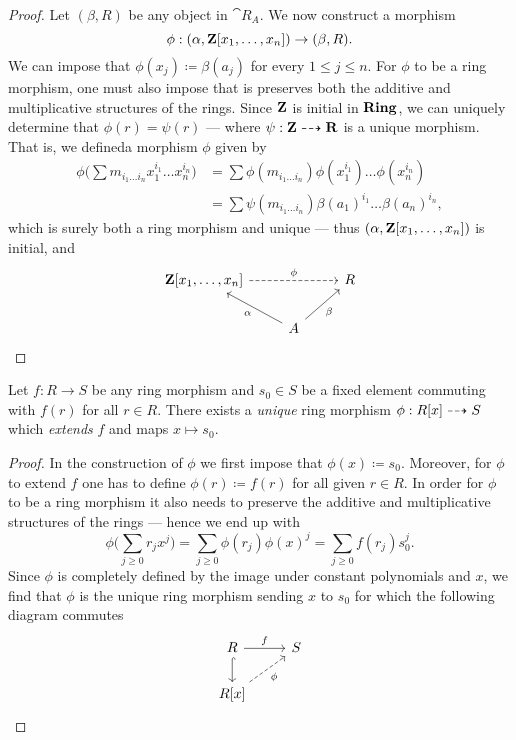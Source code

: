 %
\begin{proof}
Let \((\beta, R)\) be any object in \(\cat R_A\). We now construct a morphism
\[
\phi: (\alpha, \mathbf{Z}[x_1, \dots, x_n]) \to (\beta, R).
\]
We can impose that \(\phi(x_j) \coloneq \beta(a_j)\) for every
\(1 \leq j \leq n\). For \(\phi\) to be a ring morphism, one must also impose
that is preserves both the additive and multiplicative structures of the
rings. Since \(\mathbf{Z}\) is initial in \({\textbf{Ring}}\), we can uniquely determine that
\(\phi(r) = \psi(r)\) --- where \(\psi: \mathbf{Z} \dashrightarrow \mathbf{R}\) is a unique
morphism. That is, we defineda morphism \(\phi\) given by
\begin{align*}
  \phi\bigg( \sum m_{i_1 \dots i_n} x_1^{i_1} \dots x_n^{i_n} \bigg)
  &= \sum \phi(m_{i_1 \dots i_n}) \phi(x_1^{i_1}) \dots \phi(x_n^{i_n}) \\
  &= \sum \psi(m_{i_1 \dots i_n}) \beta(a_1)^{i_1} \dots \beta(a_n)^{i_n},
\end{align*}
which is surely both a ring morphism and unique --- thus \((\alpha, \mathbf{Z}[x_1,
\dots, x_n])\) is initial, and
\[
\begin{tikzcd}
\Z[x_1, \dots, x_n] \ar[rr, dashed, "\phi"] & &R \\
&A \ar[lu, "\alpha"] \ar[ru, swap, "\beta"]   &
\end{tikzcd}
\]
\end{proof}
%

%
\begin{proposition}
\label{prop:universal-property-polynomial-rings}
Let \(f: R \to S\) be any ring morphism and \(s_0 \in S\) be a fixed element
commuting with \(f(r)\) for all \(r \in R\). There exists a \emph{unique} ring
morphism \(\phi: R[x] \dashrightarrow S\) which \emph{extends} \(f\) and maps
\(x \mapsto s_0\).
\end{proposition}
%

%
\begin{proof}
In the construction of \(\phi\) we first impose that \(\phi(x) \coloneq
s_0\). Moreover, for \(\phi\) to extend \(f\) one has to define \(\phi(r)
\coloneq f(r)\) for all given \(r \in R\). In order for \(\phi\) to be a ring
morphism it also needs to preserve the additive and multiplicative structures of
the rings --- hence we end up with
\[
\phi\bigg( \sum_{j \geq 0} r_j x^j \bigg)
= \sum_{j \geq 0} \phi(r_j) \phi(x)^j
= \sum_{j \geq 0} f(r_j) s_0^j.
\]
Since \(\phi\) is completely defined by the image under constant polynomials and
\(x\), we find that \(\phi\) is the unique ring morphism sending \(x\) to
\(s_0\) for which the following diagram commutes
\[
\begin{tikzcd}
R \ar[d, hook] \ar[r, "f"]         & S \\
R[x] \ar[ru, dashed, swap, "\phi"] &
\end{tikzcd}
\]
\end{proof}
%

